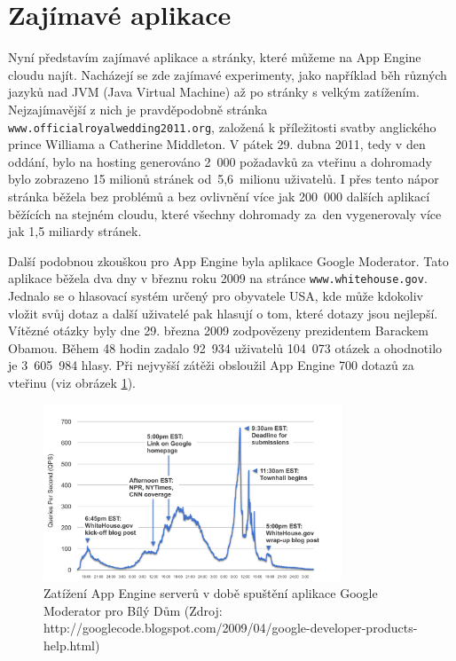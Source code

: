 \section{Zajímavé aplikace}
Nyní představím zajímavé aplikace a stránky, které můžeme na App Engine cloudu najít. Nacházejí se zde zajímavé experimenty, jako například běh různých jazyků nad JVM (Java Virtual Machine) až po stránky s velkým zatížením. Nejzajímavější z nich je pravděpodobně stránka \verb|www.officialroyalwedding2011.org|, založená k příležitosti svatby anglického prince Williama a Catherine Middleton. V pátek 29. dubna 2011, tedy v den oddání, bylo na hosting generováno 2~000 požadavků za vteřinu a dohromady bylo zobrazeno 15 milionů stránek od~5,6~milionu uživatelů. I přes tento nápor stránka běžela bez problémů a bez ovlivnění více jak 200~000 dalších aplikací běžících na stejném cloudu, které všechny dohromady za~den vygenerovaly více jak 1,5 miliardy stránek. \cite{web:royal-wedding}

Další podobnou zkouškou pro App Engine byla aplikace Google Moderator. Tato aplikace běžela dva dny v březnu roku 2009 na stránce \verb|www.whitehouse.gov|. Jednalo se o hlasovací systém určený pro obyvatele USA, kde může kdokoliv vložit svůj dotaz a další uživatelé pak hlasují o tom, které dotazy jsou nejlepší. Vítězné otázky byly dne 29. března 2009 zodpovězeny prezidentem Barackem Obamou. Během 48 hodin zadalo 92~934 uživatelů 104~073 otázek a ohodnotilo je 3~605~984 hlasy. Při nejvyšší zátěži obsloužil App Engine 700 dotazů za vteřinu (viz obrázek \ref{fig:whitehouse-app-picture}). \cite{web:whitehouse-app}

\begin{figure}[h]
\begin{center}
\includegraphics[width=3.5in]{figures/townhallgraphic.png}
\caption[Zatížení App Engine serverů v době spuštění aplikace Google Moderator pro Bílý Dům]{Zatížení App Engine serverů v době spuštění aplikace Google Moderator pro Bílý Dům (Zdroj: http://googlecode.blogspot.com/2009/04/google-developer-products-help.html)}
\label{fig:whitehouse-app-picture}
\end{center}
\end{figure}

